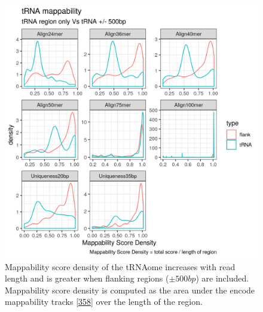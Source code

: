 \documentclass[
]{book}
\begin{document}
\begin{figure}

{\centering \includegraphics[width=1\linewidth]{./figs/mappabilityScoreDensity_tRNAVsFlank500} 

}

\caption{Mappability score density of the tRNAome increases with read length and is greater when flanking regions (\(\pm500bp\)) are included. Mappability score density is computed as the area under the encode mappability tracks {[}\protect\hyperlink{ref-Derrien2012}{358}{]} over the length of the region.}\label{fig:mappabilityScoreDensity}
\end{figure}
\end{document}
